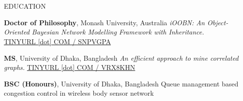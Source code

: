 \section{\faGraduationCap}{EDUCATION}
    
{\textbf{Doctor of Philosophy}, Monash University, Australia} %
{{\em iOOBN: An Object-Oriented Bayesian Network Modelling Framework with Inheritance.}\\ \href{https://tinyurl.com/snpvgpa}{TINYURL [dot] COM / SNPVGPA}}
    
{\textbf{MS}, University of Dhaka, Bangladesh} %
{{\em An efficient approach to mine correlated graphs.} \href{https://tinyurl.com/vrx8khn}{TINYURL [dot] COM / VRX8KHN}}

{\textbf{BSC (Honours)}, University of Dhaka, Bangladesh} %
{Queue management based congestion control in wireless body sensor network}